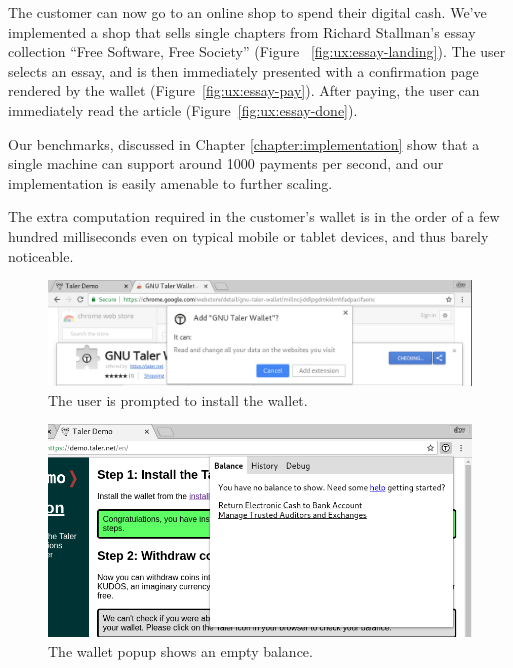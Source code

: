 The customer can now go to an online shop to spend their digital cash.  We've
implemented a shop that sells single chapters from Richard Stallman's essay
collection ``Free Software, Free Society'' \cite{stallman2002essays} (Figure~%
\ref{fig:ux:essay-landing}).  The user selects an essay, and is then
immediately presented with a confirmation page rendered by the wallet (Figure~\ref{fig:ux:essay-pay}).
After paying, the user can immediately read the article (Figure~\ref{fig:ux:essay-done}).

Our benchmarks, discussed in Chapter \ref{chapter:implementation} show that a
single machine can support around 1000 payments per second, and our
implementation is easily amenable to further scaling.

The extra computation required in the customer's wallet is in the order of a
few hundred milliseconds even on typical mobile or tablet devices, and thus
barely noticeable.

\begin{figure}
\centering
\includegraphics[width=\textwidth]{taler-screenshots/wallet-install-prompt.png}
\caption{The user is prompted to install the wallet.}
\label{fig:ux:install-prompt}
\end{figure}

\begin{figure}
\centering
\includegraphics[width=\textwidth]{taler-screenshots/wallet-installed.png}
\caption{The wallet popup shows an empty balance.}
\label{fig:ux:installed}
\end{figure}

